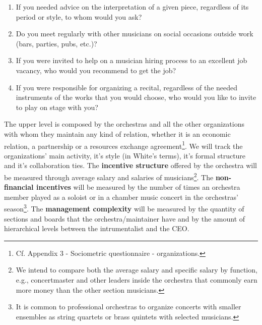 \documentclass[a4paper, 12pt, openright, oneside, german, french, brazil, english]{abntex2}
\begin{document}
        \begin{enumerate}
        \item If you needed advice on the interpretation of a given piece, regardless of its period or style, to whom would you ask?
        \item Do you meet regularly with other musicians on social occasions outside work (bars, parties, pubs, etc.)?
        \item If you were invited to help on a musician hiring process to an excellent job vacancy, who would you recommend to get the job?
        \item If you were responsible for organizing a recital, regardless of the needed instruments of the works that you would choose, who would you like to invite to play on stage with you?
        \end{enumerate}
	
	
	The upper level is composed by the orchestras and all the other organizations with whom they maintain any kind of relation, whether it is an economic relation, a partnership or a resources exchange agreement\footnote{Cf. Appendix 3 - Sociometric questionnaire - organizations.}. We will track the organizations' main activity, it's style (in White's terms), it's formal structure and it's collaboration ties. The \textbf{incentive structure} offered by the orchestra will be measured through average salary and salaries of musicians\footnote{We intend to compare both the average salary and specific salary by function, e.g., concertmaster and other leaders inside the orchestra that commonly earn more money than the other section musicians.}. The \textbf{non-financial incentives} will be measured by the number of times an orchestra member played as a soloist or in a chamber music concert in the orchestras' season\footnote{It is common to professional orchestras to organize concerts with smaller ensembles as string quartets or brass quintets with selected musicians.}. The \textbf{management complexity} will be measured by the quantity of sections and boards that the orchestra/maintainer have and by the amount of hierarchical levels between the intrumentalist and the CEO.
	
\end{document}
